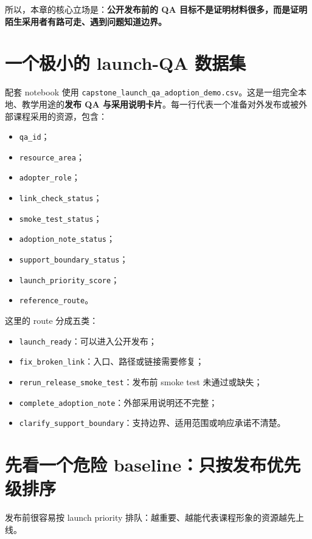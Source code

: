 所以，本章的核心立场是：\textbf{公开发布前的 QA 目标不是证明材料很多，而是证明陌生采用者有路可走、遇到问题知道边界。}

\section{一个极小的 launch-QA 数据集}

配套 notebook 使用 \nolinkurl{capstone_launch_qa_adoption_demo.csv}。这是一组完全本地、教学用途的\textbf{发布 QA 与采用说明卡片}。每一行代表一个准备对外发布或被外部课程采用的资源，包含：

\begin{itemize}
    \item \texttt{qa\_id}；
    \item \texttt{resource\_area}；
    \item \texttt{adopter\_role}；
    \item \texttt{link\_check\_status}；
    \item \texttt{smoke\_test\_status}；
    \item \texttt{adoption\_note\_status}；
    \item \texttt{support\_boundary\_status}；
    \item \texttt{launch\_priority\_score}；
    \item \texttt{reference\_route}。
\end{itemize}

这里的 route 分成五类：

\begin{itemize}
    \item \texttt{launch\_ready}：可以进入公开发布；
    \item \texttt{fix\_broken\_link}：入口、路径或链接需要修复；
    \item \texttt{rerun\_release\_smoke\_test}：发布前 smoke test 未通过或缺失；
    \item \texttt{complete\_adoption\_note}：外部采用说明还不完整；
    \item \texttt{clarify\_support\_boundary}：支持边界、适用范围或响应承诺不清楚。
\end{itemize}

\section{先看一个危险 baseline：只按发布优先级排序}

发布前很容易按 launch priority 排队：越重要、越能代表课程形象的资源越先上线。

